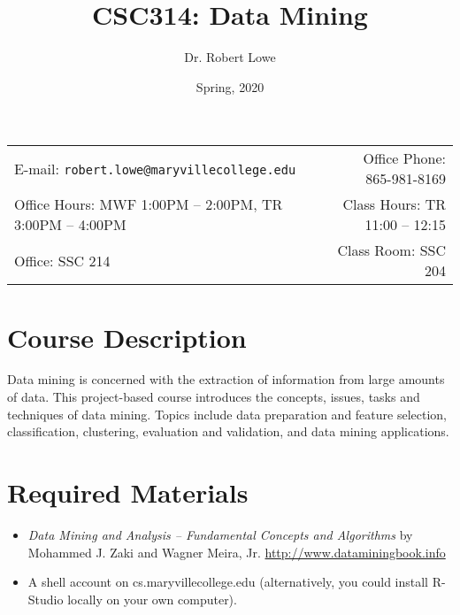 \documentclass[11pt]{article}
\title{CSC314: Data Mining}
\author{Dr. Robert Lowe}
\date{Spring, 2020}
\newcommand{\blankline}{\quad\pagebreak[2]}
\begin{document}
\maketitle

\blankline

\begin{tabular*}{.93\textwidth}{@{\extracolsep{\fill}}lr}

E-mail: \texttt{robert.lowe@maryvillecollege.edu} & Office Phone: 865-981-8169 \\

 Office Hours: MWF 1:00PM -- 2:00PM, TR 3:00PM -- 4:00PM  &  Class Hours: TR 11:00 -- 12:15\\
 Office: SSC 214 & Class Room: SSC 204\\
\hline
\end{tabular*}

\vspace{5 mm}

\section*{Course Description}
Data mining is concerned with the extraction of information from large
amounts of data. This project-based course introduces the concepts,
issues, tasks and techniques of data mining. Topics include data
preparation and feature selection, classification, clustering,
evaluation and validation, and data mining applications. 

\section*{Required Materials}
\begin{itemize}
    \item \textit{Data Mining and Analysis -- Fundamental Concepts and
    Algorithms} by  Mohammed J. Zaki and  Wagner Meira, Jr.
    \newline\url{http://www.dataminingbook.info}
    \item A shell account on cs.maryvillecollege.edu (alternatively,
        you could install R-Studio locally on your own computer). 
\end{itemize}

\end{document}
